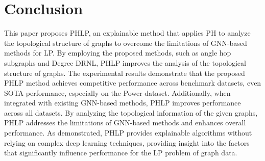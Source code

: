 \section{Conclusion}
This paper proposes PHLP, an explainable method that applies PH to analyze the topological structure of graphs to overcome the limitations of GNN-based methods for LP.
By employing the proposed methods, such as angle hop subgraphs and Degree DRNL, PHLP improves the analysis of the topological structure of graphs.
The experimental results demonstrate that the proposed PHLP method achieves competitive performance across benchmark datasets, even SOTA performance, especially on the Power dataset. 
Additionally, when integrated with existing GNN-based methods, PHLP improves performance across all datasets.
By analyzing the topological information of the given graphs, PHLP addresses the limitations of GNN-based methods and enhances overall performance. 
As demonstrated, PHLP provides explainable algorithms without relying on complex deep learning techniques, providing insight into the factors that significantly influence performance for the LP problem of graph data. 